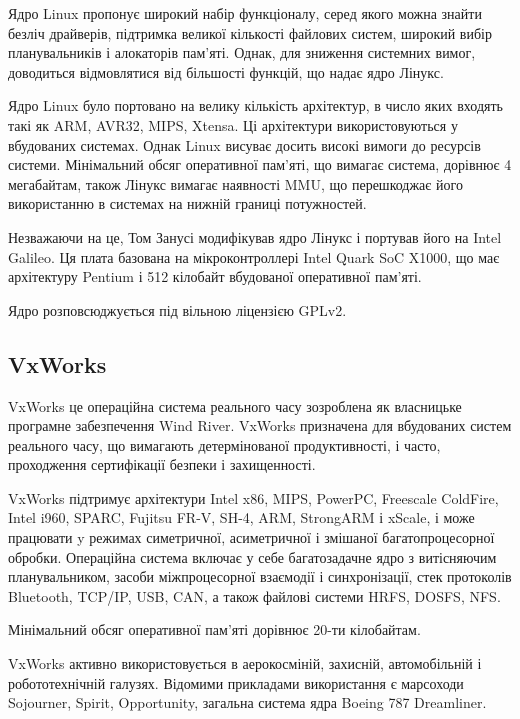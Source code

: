 \documentclass[oneside,14pt,a4paper,final]{myextreport}
\begin{document}
Ядро Linux\cite{linux} пропонує широкий набір функціоналу, серед якого можна знайти безліч драйверів, підтримка великої кількості файлових систем, широкий вибір планувальників і алокаторів пам'яті. Однак, для зниження системних вимог, доводиться відмовлятися від більшості функцій, що надає ядро Лінукс.

Ядро Linux було портовано на велику кількість архітектур, в число яких входять такі як ARM, AVR32, MIPS, Xtensa. Ці архітектури використовуються у вбудованих системах. Однак Linux висуває досить високі вимоги до ресурсів системи. Мінімальний обсяг оперативної пам'яті, що вимагає система, дорівнює 4 мегабайтам, також Лінукс вимагає наявності \ac{MMU}, що перешкоджає його використанню в системах на нижній границі потужностей.

Незважаючи на це, Том Занусі модифікував ядро Лінукс і портував його на Intel Galileo\cite{linux-galileo}. Ця плата базована на мікроконтроллері Intel Quark SoC X1000, що має архітектуру Pentium і 512 кілобайт вбудованої оперативної пам'яті\cite{intel-galileo}.

Ядро розповсюджується під вільною ліцензією GPLv2.

\subsection{VxWorks}

VxWorks\cite{vxworks} це операційна система реального часу зозроблена як власницьке програмне забезпечення Wind River. VxWorks призначена для вбудованих систем реального часу, що вимагають детермінованої продуктивності, і часто, проходження сертифікації безпеки і захищенності.

VxWorks підтримує архітектури Intel x86, MIPS, PowerPC, Freescale ColdFire, Intel i960, SPARC, Fujitsu FR-V, SH-4, ARM, StrongARM і xScale, і може працювати y режимах симетричної, асиметричної і змішаної багатопроцесорної обробки. Операційна система включає у себе багатозадачне ядро з витісняючим планувальником, засоби міжпроцесорної взаємодії і синхронізації, стек протоколів Bluetooth, \acs{TCP/IP}, \acs{USB}, \acs{CAN}, а також файлові системи \ac{HRFS}, \acs{DOSFS}, \ac{NFS}.

Мінімальний обсяг оперативної пам'яті дорівнює 20-ти кілобайтам.

VxWorks активно використовується в аерокосміній, захисній, автомобільній і робототехнічній галузях. Відомими прикладами використання є марсоходи Sojourner, Spirit, Opportunity\cite{vxworks:rovers}, загальна система ядра Boeing 787 Dreamliner\cite{vxworks:boeing}.
\end{document}
